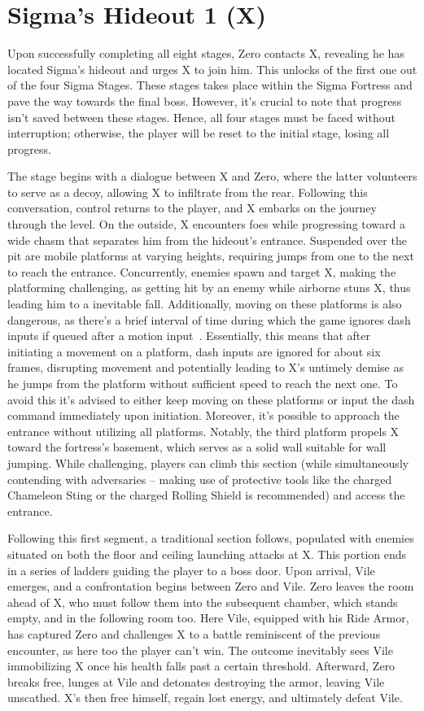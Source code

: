\section{Sigma's Hideout 1 (X)}
Upon successfully completing all eight stages, Zero contacts X, revealing he has located Sigma's hideout and urges X to join him. This unlocks of the first one out of the four Sigma Stages. These stages takes place within the Sigma Fortress and pave the way towards the final boss. However, it's crucial to note that progress isn't saved between these stages. Hence, all four stages must be faced without interruption; otherwise, the player will be reset to the initial stage, losing all progress.

The stage begins with a dialogue between X and Zero, where the latter volunteers to serve as a decoy, allowing X to infiltrate from the rear. Following this conversation, control returns to the player, and X embarks on the journey through the level. On the outside, X encounters foes while progressing toward a wide chasm that separates him from the hideout's entrance. Suspended over the pit are mobile platforms at varying heights, requiring jumps from one to the next to reach the entrance. Concurrently, enemies spawn and target X, making the platforming challenging, as getting hit by an enemy while airborne stuns X, thus leading him to a inevitable fall. Additionally, moving on these platforms is also dangerous, as there's a brief interval of time during which the game ignores dash inputs if queued after a motion input~\cite{RTA_wiki:X1}. Essentially, this means that after initiating a  movement on a platform, dash inputs are ignored for about six frames, disrupting movement and potentially leading to X's untimely demise as he jumps from the platform without sufficient speed to reach the next one. To avoid this it's advised to either keep  moving on these platforms or input the dash command immediately upon initiation. Moreover, it's possible to approach the entrance without utilizing all platforms. Notably, the third platform propels X toward the fortress's basement, which serves as a solid wall suitable for wall jumping. While challenging, players can climb this section (while simultaneously contending with adversaries – making use of protective tools like the charged Chameleon Sting or the charged Rolling Shield is recommended) and access the entrance.

Following this first segment, a traditional section follows, populated with enemies situated on both the floor and ceiling launching attacks at X. This portion ends in a series of ladders guiding the player to a boss door. Upon arrival, Vile emerges, and a confrontation begins between Zero and Vile. Zero leaves the room ahead of X, who must follow them into the subsequent chamber, which stands empty, and in the following room too. Here Vile, equipped with his Ride Armor, has captured Zero and challenges X to a battle reminiscent of the previous encounter, as here too the player can't win. The outcome inevitably sees Vile immobilizing X once his health falls past a certain threshold. Afterward, Zero breaks free, lunges at Vile and detonates destroying the armor, leaving Vile unscathed. X's then free himself, regain lost energy, and ultimately defeat Vile.

